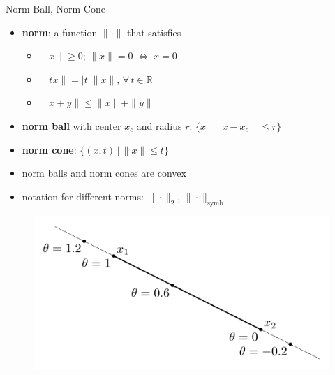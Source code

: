 \documentclass[10pt]{beamer}
\newcommand{\ds}{\displaystyle}
\newcommand{\ifff}{\;\Longleftrightarrow\;}
\theoremstyle{definition}
\begin{document}
\begin{frame}{Norm Ball, Norm Cone}
\begin{itemize}
  \item {\bf norm}: a function $\|\cdot\|$ that satisfies 
    \begin{itemize}
      \item $\|x\|\geqslant 0$; $\|x\| = 0\ifff x = 0$
      \item $\|tx\| = |t|\|x\|$, $\forall\,t\in\mathbb{R}$
      \item $\|x + y\|\leqslant\|x\| + \|y\|$
    \end{itemize}
  \item {\bf norm ball} with center $x_c$ and radius $r$: $\ds\{x\,|\,\|x - x_c\|\leqslant r\}$
  \item {\bf norm cone}: $\ds\{(x, t)\,|\,\|x\|\leqslant t\}$
  \item norm balls and norm cones are convex
  \item notation for different norms: $\|\cdot\|_2$, $\|\cdot\|_{\text{symb}}$
\end{itemize}

\begin{figure}[!htbp]
  \centering
  \includegraphics[scale=0.9,page=9]{fig/note06/02.pdf}
\end{figure}

\end{frame}
\end{document}
